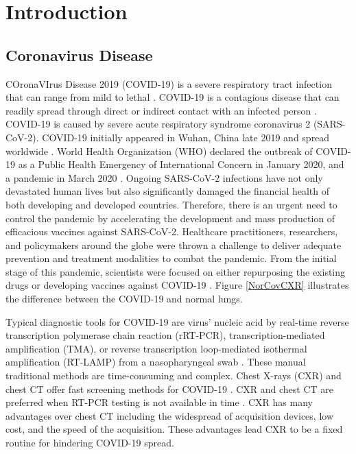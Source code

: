 
\chapter{Introduction} %




\label{chp:intro} %
\section{Coronavirus Disease}

COronaVIrus Disease 2019 (COVID-19) is a severe respiratory tract infection that can range from mild to lethal \cite{acter2020evolution}. COVID-19 is a contagious disease that can readily spread through direct or indirect contact with an infected person \cite{singhal2020review}. COVID-19 is caused by severe acute respiratory syndrome coronavirus 2 (SARS-CoV-2). COVID-19 initially appeared in Wuhan, China late 2019 and spread worldwide \cite{hui2020continuing}. World Health Organization (WHO) declared the outbreak of COVID-19 as a Public Health Emergency of International Concern in January 2020, and a pandemic in March 2020 \cite{platto2020covid19}.
Ongoing SARS-CoV-2 infections have not only devastated human lives but also significantly damaged the financial health of both developing and developed countries. Therefore, there is an urgent need to control the pandemic by accelerating the development and mass production of efficacious vaccines against SARS-CoV-2. Healthcare practitioners, researchers, and policymakers around the globe were thrown a challenge to deliver adequate prevention and treatment modalities to combat the pandemic. From the initial stage of this pandemic, scientists were focused on either repurposing the existing drugs or developing vaccines against COVID-19 \cite{le2020evolution}. Figure \ref{NorCovCXR} illustrates the difference between the COVID-19 and normal lungs.

Typical diagnostic tools for COVID-19 are virus’ nucleic acid by real-time reverse transcription polymerase chain reaction (rRT-PCR), transcription-mediated amplification (TMA), or reverse transcription loop-mediated isothermal amplification (RT-LAMP) from a nasopharyngeal swab \cite{tahamtan2020real}.  These manual traditional methods are time-consuming and complex. Chest X-rays (CXR) and chest CT offer fast screening methods for COVID-19 \cite{salehi2020coronavirus}\cite{wu2020new}\cite{zu2020coronavirus}. CXR and chest CT are preferred when RT-PCR testing is not available in time \cite{erickson1993advanced}. CXR has many advantages over chest CT including the widespread of acquisition devices, low cost, and the speed of the acquisition\cite{narin2021automatic}\cite{brenner2007computed}\cite{rubin2020role}\cite{shi2020review}. These advantages lead CXR to be a fixed routine for hindering COVID-19 spread. 

